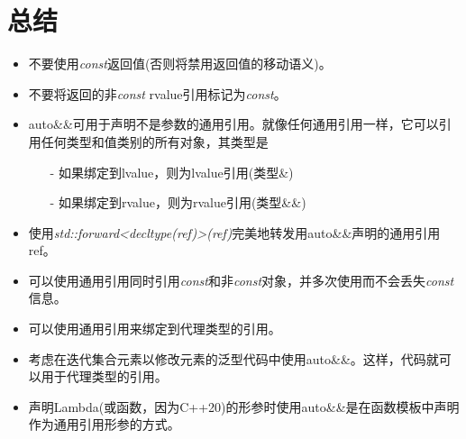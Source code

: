 \section{总结}
\begin{itemize}
	\item 不要使用\textit{const}返回值(否则将禁用返回值的移动语义)。
	\item 不要将返回的非\textit{const} rvalue引用标记为\textit{const}。
	\item auto\&\&可用于声明不是参数的通用引用。就像任何通用引用一样，它可以引用任何类型和值类别的所有对象，其类型是
	\begin{itemize}
		\item[-] 如果绑定到lvalue，则为lvalue引用(类型\&)
		\item[-] 如果绑定到rvalue，则为rvalue引用(类型\&\&)
	\end{itemize}
	\item 使用\textit{std::forward<decltype(ref)>(ref)}完美地转发用auto\&\&声明的通用引用ref。
	\item 可以使用通用引用同时引用\textit{const}和非\textit{const}对象，并多次使用而不会丢失\textit{const}信息。
	\item 可以使用通用引用来绑定到代理类型的引用。
	\item 考虑在迭代集合元素以修改元素的泛型代码中使用auto\&\&。这样，代码就可以用于代理类型的引用。
	\item 声明Lambda(或函数，因为C++20)的形参时使用auto\&\&是在函数模板中声明作为通用引用形参的方式。
\end{itemize}



